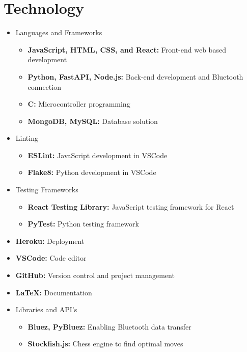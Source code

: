 \documentclass{article}
\begin{document}
\section{Technology}

\begin{itemize}
\item Languages and Frameworks
\begin{itemize}
    \item \textbf{JavaScript, HTML, CSS, and React:} Front-end web based development
    \item \textbf{Python, FastAPI, Node.js:} Back-end development and Bluetooth connection
    \item \textbf{C:} Microcontroller programming
    \item \textbf{MongoDB, MySQL:} Database solution
\end{itemize}

\item Linting
\begin{itemize}
    \item \textbf{ESLint:} JavaScript development in VSCode
    \item \textbf{Flake8:} Python development in VSCode
\end{itemize} 

\item Testing Frameworks
\begin{itemize}
    \item \textbf{React Testing Library:} JavaScript testing framework for React
    \item \textbf{PyTest:} Python testing framework
\end{itemize}

\item \textbf{Heroku:} Deployment

\item \textbf{VSCode:} Code editor

\item \textbf{GitHub:} Version control and project management

\item \textbf{LaTeX:} Documentation

\item Libraries and API's
\begin{itemize}
    \item \textbf{Bluez, PyBluez:} Enabling Bluetooth data transfer
    \item \textbf{Stockfish.js:} Chess engine to find optimal moves
\end{itemize}


\end{itemize}
\end{document}
